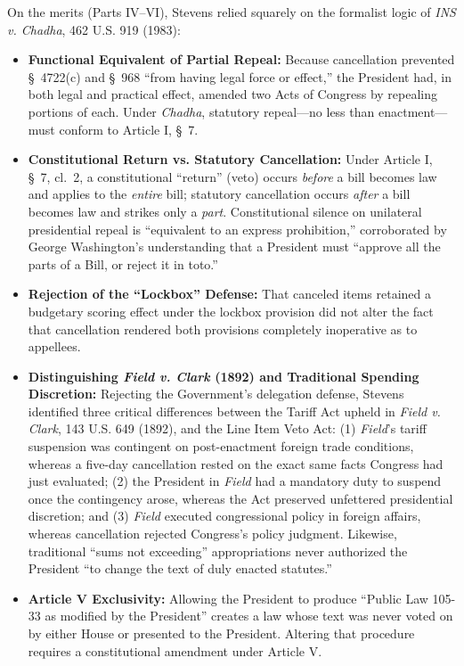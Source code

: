 \documentclass[12pt]{article}
\begin{document}
On the merits (Parts IV--VI), Stevens relied squarely on the formalist logic of \textit{INS v. Chadha}, 462 U.S. 919 (1983):
\begin{itemize}
  \item \textbf{Functional Equivalent of Partial Repeal:} Because cancellation prevented \S~4722(c) and \S~968 ``from having legal force or effect,'' the President had, in both legal and practical effect, amended two Acts of Congress by repealing portions of each. Under \textit{Chadha}, statutory repeal---no less than enactment---must conform to Article I, \S~7.
  \item \textbf{Constitutional Return vs. Statutory Cancellation:} Under Article I, \S~7, cl.~2, a constitutional ``return'' (veto) occurs \emph{before} a bill becomes law and applies to the \emph{entire} bill; statutory cancellation occurs \emph{after} a bill becomes law and strikes only a \emph{part}. Constitutional silence on unilateral presidential repeal is ``equivalent to an express prohibition,'' corroborated by George Washington's understanding that a President must ``approve all the parts of a Bill, or reject it in toto.''
  \item \textbf{Rejection of the ``Lockbox'' Defense:} That canceled items retained a budgetary scoring effect under the lockbox provision did not alter the fact that cancellation rendered both provisions completely inoperative as to appellees.

\item \textbf{Distinguishing \textit{Field v. Clark} (1892) and Traditional Spending Discretion:} Rejecting the Government's delegation defense, Stevens identified three critical differences between the Tariff Act upheld in \textit{Field v. Clark}, 143 U.S. 649 (1892), and the Line Item Veto Act: (1) \textit{Field}'s tariff suspension was contingent on post-enactment foreign trade conditions, whereas a five-day cancellation rested on the exact same facts Congress had just evaluated; (2) the President in \textit{Field} had a mandatory duty to suspend once the contingency arose, whereas the Act preserved unfettered presidential discretion; and (3) \textit{Field} executed congressional policy in foreign affairs, whereas cancellation rejected Congress's policy judgment. Likewise, traditional ``sums not exceeding'' appropriations never authorized the President ``to change the text of duly enacted statutes.''
  \item \textbf{Article V Exclusivity:} Allowing the President to produce ``Public Law 105-33 as modified by the President'' creates a law whose text was never voted on by either House or presented to the President. Altering that procedure requires a constitutional amendment under Article V.
\end{itemize}
\end{document}
